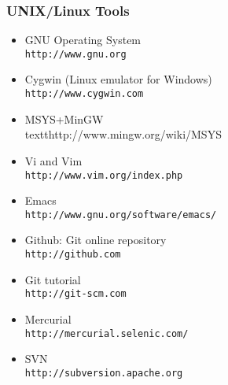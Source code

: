 \documentclass[ChapterTOCs,krantz2]{krantz} %
\newcommand{\unix}{UNIX}
\begin{document}
\subsubsection{\unix{}/Linux Tools}
\begin{itemize}
\item GNU Operating System\\\texttt{http://www.gnu.org}
\item Cygwin (Linux emulator for Windows)\\\texttt{http://www.cygwin.com}
\item MSYS+MinGW \\textt{http://www.mingw.org/wiki/MSYS}

\item Vi and Vim\\ \texttt{http://www.vim.org/index.php}
\item Emacs\\ \texttt{http://www.gnu.org/software/emacs/}
\item Github: Git online repository\\ \texttt{http://github.com}
\item Git tutorial \\\texttt{http://git-scm.com}
\item Mercurial \\\texttt{http://mercurial.selenic.com/}
\item SVN \\\texttt{http://subversion.apache.org}
\end{itemize}
\end{document}
